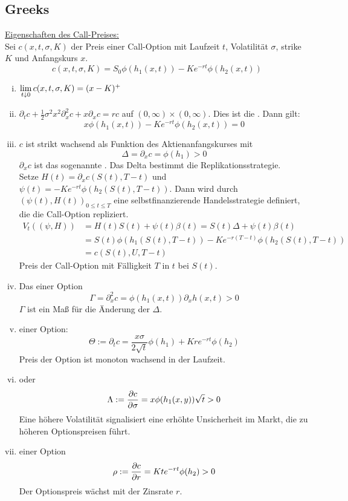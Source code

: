 \subsection{Greeks}
\label{sub:greeks}
\uline{Eigenschaften des Call-Preises:}\\
Sei $c(x,t,\sigma,K)$ der Preis einer Call-Option mit Laufzeit $t$, Volatilität $\sigma$, strike $K$ und Anfangskurs $x$.
\[
c(x,t,\sigma,K)= S_0\phi(h_1(x,t))-Ke^{-rt}\phi(h_2(x,t))
\]
\begin{enumerate}[(i)]
	\item $\lim\ablim{t\downarrow 0}c(x,t,\sigma,K)=(x-K)^+$
	\item $\partial_tc+\frac{1}{2}\sigma^2x^2\partial_x^2c+x\partial_xc=rc$ auf $(0,\infty)\times(0,\infty)$.
	Dies ist die .
	Dann gilt:
	\[
	x\phi(h_1(x,t))-Ke^{-rt}\phi(h_2(x,t))=0
	\]
	\item $c$ ist strikt wachsend als Funktion des Aktienanfangskurses mit
	\[
	\Delta =\partial_xc=\phi(h_1)>0
	\]
	$\partial_xc$ ist das sogenannte .
	Das Delta bestimmt die Replikationsstrategie.\\
	Setze $H(t)=\partial_xc(S(t),T-t)$ und $\psi(t)=-Ke^{-rt}\phi(h_2(S(t),T-t))$.
	Dann wird durch $(\psi(t),H(t))_{0\le t\le T}$ eine selbstfinanzierende Handelsstrategie definiert, die die Call-Option repliziert.
	\begin{equation*}
	\begin{aligned}
		V_t((\psi,H)) &= H(t)S(t)+\psi(t)\beta(t)=S(t)\Delta+\psi(t)\beta(t)\\
		&= S(t)\phi(h_1(S(t),T-t))-Ke^{-r(T-t)}\phi(h_2(S(t),T-t))\\
		&= c(S(t),U,T-t)
	\end{aligned}
	\end{equation*}
	Preis der Call-Option mit Fälligkeit $T$ in $t$ bei $S(t)$.
	\item Das  einer Option
	\[
	\Gamma=\partial_x^2c=\phi(h_1(x,t))\partial_xh(x,t)>0
	\]
	$\Gamma$ ist ein Maß für die Änderung der $\Delta$.
	\item {} einer Option:
	\[
	\Theta:= \partial_tc=\frac{x\sigma}{2\sqrt{t}}\phi(h_1)+Kre^{-rt}\phi(h_2)
	\]
	Preis der Option ist monoton wachsend in der Laufzeit.
	\item {} oder 
	\[
	\Lambda := \frac{\partial c}{\partial \sigma} =x\phi(h_1(x,y))\sqrt{t}>0
	\]
	Eine höhere Volatilität signalisiert eine erhöhte Unsicherheit im Markt, die zu höheren Optionspreisen führt.
	\item {} einer Option
	\[
	\rho:= \frac{\partial c}{\partial r} =Kte^{-rt}\phi(h_2)>0
	\]
	Der Optionspreis wächst mit der Zinsrate $r$.
\end{enumerate}

